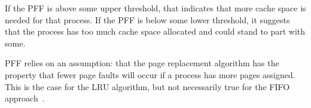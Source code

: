 If the PFF is above some upper threshold, that indicates that more cache space is needed for that process. If the PFF is below some lower threshold, it suggests that the process has too much cache space allocated and could stand to part with some.

PFF relies on an assumption: that the page replacement algorithm has the property that fewer page faults will occur if a process has more pages assigned. This is the case for the LRU algorithm, but not necessarily true for the FIFO approach~\cite{mte241}.





